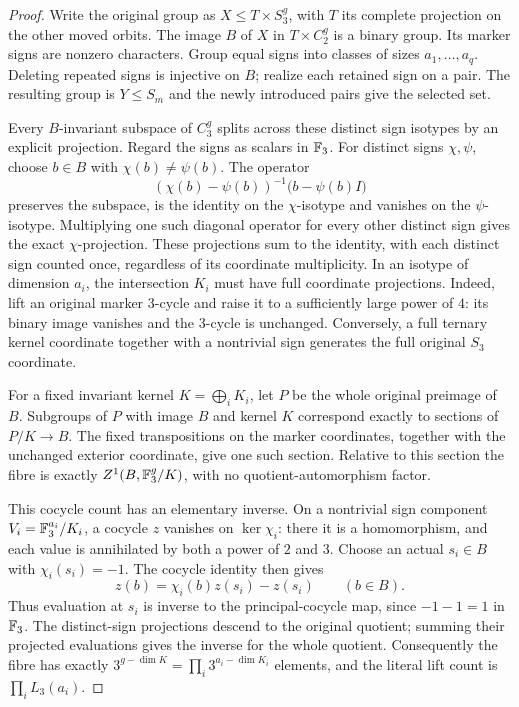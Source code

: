 \begin{proof}
Write the original group as $X\leq T\times S_3^g$, with $T$ its
complete projection on the other moved orbits. The image $B$ of $X$
in $T\times C_2^g$ is a binary group. Its marker signs are nonzero
characters. Group equal signs into classes of sizes $a_1,\ldots,a_q$.
Deleting repeated signs is injective on $B$; realize each retained
sign on a pair. The resulting group is $Y\leq S_m$ and the newly
introduced pairs give the selected set.

Every $B$-invariant subspace of $C_3^g$ splits across these distinct
sign isotypes by an explicit projection. Regard the signs as scalars
in $\mathbb F_3$. For distinct signs $\chi,\psi$, choose $b\in B$ with
$\chi(b)\ne\psi(b)$. The operator
\[
 (\chi(b)-\psi(b))^{-1}\bigl(b-\psi(b)I\bigr)
\]
preserves the subspace, is the identity on the $\chi$-isotype and
vanishes on the $\psi$-isotype. Multiplying one such diagonal operator
for every other distinct sign gives the exact $\chi$-projection.
These projections sum to the identity, with each distinct sign counted
once, regardless of its coordinate multiplicity.
In an isotype of dimension $a_i$, the intersection $K_i$ must have
full coordinate projections. Indeed, lift an original marker
$3$-cycle and raise it to a sufficiently large power of $4$:
its binary image vanishes and the $3$-cycle is unchanged. Conversely,
a full ternary kernel coordinate together with a nontrivial sign
generates the full original $S_3$ coordinate.

For a fixed invariant kernel $K=\bigoplus_i K_i$, let $P$ be the
whole original preimage of $B$. Subgroups of $P$ with image $B$
and kernel $K$ correspond exactly to sections of $P/K\to B$.
The fixed transpositions on the marker coordinates, together with
the unchanged exterior coordinate, give one such section.
Relative to this section the fibre is exactly
$Z^1(B,\mathbb F_3^g/K)$, with no quotient-automorphism factor.

This cocycle count has an elementary inverse. On a nontrivial sign
component $V_i=\mathbb F_3^{a_i}/K_i$, a cocycle $z$ vanishes on
$\ker\chi_i$: there it is a homomorphism, and each value is
annihilated by both a power of $2$ and $3$. Choose an actual
$s_i\in B$ with $\chi_i(s_i)=-1$. The cocycle identity then gives
\[
 z(b)=\chi_i(b)z(s_i)-z(s_i)\qquad(b\in B).
\]
Thus evaluation at $s_i$ is inverse to the principal-cocycle map,
since $-1-1=1$ in $\mathbb F_3$. The distinct-sign projections descend
to the original quotient; summing their projected evaluations
gives the inverse for the whole quotient. Consequently the fibre
has exactly $3^{g-\dim K}=\prod_i3^{a_i-\dim K_i}$ elements,
and the literal lift count is $\prod_iL_3(a_i)$.


\end{proof}
